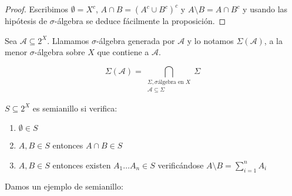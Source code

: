 \begin{proof}
 Escribimos $\emptyset = X^c$, $A\cap B = (A^c \cup B^c)^c$ y $A\setminus B = A\cap B^c$
 y usando las hipótesis de $\sigma$-álgebra se deduce fácilmente la proposición.
\end{proof}

\begin{definition}
 Sea $\mathcal{A} \subseteq 2^X$. Llamamos $\sigma$-álgebra generada por $\mathcal{A}$ y lo notamos 
 $\Sigma(\mathcal{A})$, a la menor $\sigma$-álgebra sobre $X$ que contiene a $\mathcal{A}$.
 
 \[\Sigma(\mathcal{A}) = 
   \bigcap_{\begin{array}{c}\Sigma, \sigma\textrm{álgebra en } X\\ \mathcal{A}\subseteq \Sigma \end{array}} \Sigma\]
\end{definition}

\begin{definition}[Semianillo en $X$]

 $S\subseteq 2^X$ es semianillo si verifica:
 
 \begin{enumerate}[i]
  \item $\emptyset \in S$
  \item $A,B \in S$ entonces $A\cap B \in S$
  \item $A,B \in S$ entonces existen $A_1 \ldots A_n \in S$ verificándose $A\setminus B = \sum_{i=1}^n A_i$
 \end{enumerate}
\end{definition}

Damos un ejemplo de semianillo:

